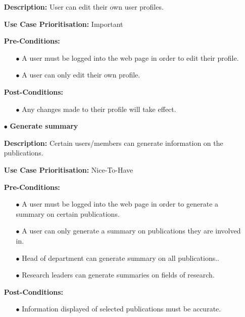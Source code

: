 \documentclass[a4paper,12pt]{article}
\begin{document}
\begin{itemize}
		\textbf{Description:} User can edit their own user profiles.\newline
	
		\textbf{Use Case Prioritisation:} Important\newline	

		\textbf{Pre-Conditions:}
		\begin{itemize}
			\item[$\bullet$]A user must be logged into the web page in order to edit their profile.
			\item[$\bullet$]A user can only edit their own profile.
			\\
		\end{itemize}
		\textbf{Post-Conditions: }
		\begin{itemize}
			\item[$\bullet$]Any changes made to their profile will take effect.
			\\
		\end{itemize}

		\newpage
		\item[$\bullet$]\textbf{Generate summary}\newline

		\textbf{Description:} Certain users/members can generate information on the publications.\newline
	
		\textbf{Use Case Prioritisation:} Nice-To-Have\newline

		\textbf{Pre-Conditions:}
		\begin{itemize}
			\item[$\bullet$]A user must be logged into the web page in order to generate a summary on certain publications.
			\item[$\bullet$]A user can only generate a summary on publications they are involved in.
			\item[$\bullet$]Head of department can generate summary on all publications..
			\item[$\bullet$]Research leaders can generate summaries on fields of research.
			\\
		\end{itemize}
		\textbf{Post-Conditions: }
		\begin{itemize}
			\item[$\bullet$]Information displayed of selected publications must be accurate.
			\\
		\end{itemize}
	\end{itemize}
\end{document}
